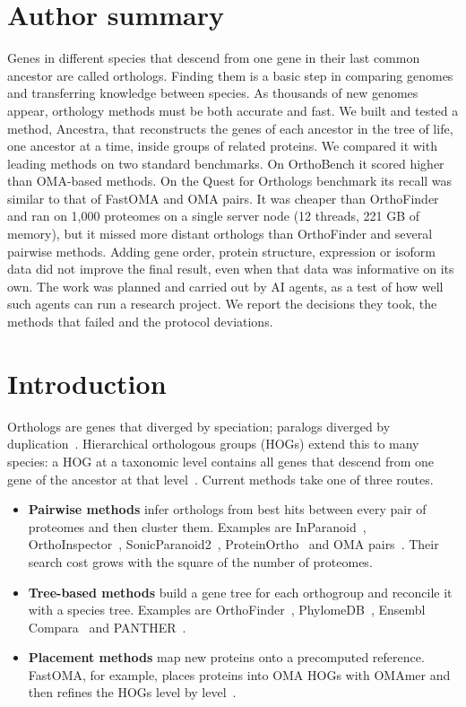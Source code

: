 \documentclass[10pt,letterpaper]{article}
\begin{document}
\section*{Author summary}
Genes in different species that descend from one gene in their last common ancestor are called orthologs. Finding them is a basic step in comparing genomes and transferring knowledge between species. As thousands of new genomes appear, orthology methods must be both accurate and fast. We built and tested a method, Ancestra, that reconstructs the genes of each ancestor in the tree of life, one ancestor at a time, inside groups of related proteins. We compared it with leading methods on two standard benchmarks. On OrthoBench it scored higher than OMA-based methods. On the Quest for Orthologs benchmark its recall was similar to that of FastOMA and OMA pairs. It was cheaper than OrthoFinder and ran on 1,000 proteomes on a single server node (12 threads, 221 GB of memory), but it missed more distant orthologs than OrthoFinder and several pairwise methods. Adding gene order, protein structure, expression or isoform data did not improve the final result, even when that data was informative on its own. The work was planned and carried out by AI agents, as a test of how well such agents can run a research project. We report the decisions they took, the methods that failed and the protocol deviations.

\linenumbers

\section*{Introduction}
Orthologs are genes that diverged by speciation; paralogs diverged by duplication~\cite{altenhoff2016qfo}. Hierarchical orthologous groups (HOGs) extend this to many species: a HOG at a taxonomic level contains all genes that descend from one gene of the ancestor at that level~\cite{altenhoff2013gethogs,sarton2025hogreview}. Current methods take one of three routes.
\begin{itemize}
\item \textbf{Pairwise methods} infer orthologs from best hits between every pair of proteomes and then cluster them. Examples are InParanoid~\cite{remm2001inparanoid,persson2022inparanoid}, OrthoInspector~\cite{nevers2019orthoinspector}, SonicParanoid2~\cite{cosentino2024sonicparanoid2}, ProteinOrtho~\cite{klemm2023proteinortho} and OMA pairs~\cite{altenhoff2024oma}. Their search cost grows with the square of the number of proteomes.
\item \textbf{Tree-based methods} build a gene tree for each orthogroup and reconcile it with a species tree. Examples are OrthoFinder~\cite{emms2019orthofinder,emms2026orthofinder3}, PhylomeDB~\cite{fuentes2022phylomedb}, Ensembl Compara~\cite{vilella2009ensemblcompara} and PANTHER~\cite{thomas2022panther}.
\item \textbf{Placement methods} map new proteins onto a precomputed reference. FastOMA, for example, places proteins into OMA HOGs with OMAmer and then refines the HOGs level by level~\cite{majidian2025fastoma,rossier2021omamer}.
\end{itemize}
\end{document}

